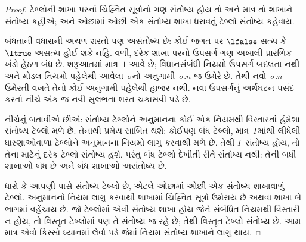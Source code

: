 \begin{proof}
ટેબ્લોની શાખા પરનાં ચિહ્નિત સૂત્રોનો ગણ સંતોષ્ય હોય
તો અને માત્ર તો શાખાને સંતોષ્ય કહીએ; અને ઓછામાં ઓછી એક સંતોષ્ય
શાખા ધરાવતું ટેબ્લો સંતોષ્ય કહેવાય.

બંધતાની વધારાની અચળ-શરતો પણ અસંતોષ્ય છે:
કોઈ જગત પર $\lfalse$ સત્ય કે $\ltrue$ અસત્ય હોઈ શકે નહિ.
વળી, દરેક શાખા પરનો ઉપસર્ગ-ગણ અખાલી પ્રારંભિક ખંડો હેઠળ
બંધ છે. શરૂઆતમાં માત્ર~$1$ આવે છે; વિધાનસંબંધી નિયમો
ઉપસર્ગ બદલતા નથી અને મોડલ નિયમો પહેલેથી આવેલા~$\sigma$નો
અનુગામી~$\sigma.n$ જ ઉમેરે છે. તેથી નવો~$\sigma.n$
ઉમેરતી વખતે તેનો કોઈ અનુગામી પહેલેથી હાજર નથી. નવા
ઉપસર્ગનું અર્થઘટન પસંદ કરતાં નીચે એક જ નવી સુલભતા-શરત
ચકાસવી પડે છે.

નીચેનું બતાવીએ છીએ: સંતોષ્ય ટેબ્લોને અનુમાનના કોઈ એક નિયમથી
વિસ્તારતાં હંમેશા સંતોષ્ય ટેબ્લો મળે છે. તેનાથી પ્રમેય
સાબિત થશે: કોઈપણ બંધ ટેબ્લો, માત્ર~$\Gamma$માંથી લીધેલી
ધારણાઓવાળા ટેબ્લોને અનુમાનના નિયમો લાગુ કરવાથી મળે છે.
તેથી $\Gamma$ સંતોષ્ય હોય, તો તેના માટેનું દરેક ટેબ્લો
સંતોષ્ય હશે. પરંતુ બંધ ટેબ્લો દેખીતી રીતે સંતોષ્ય નથી:
તેની બધી શાખાઓ બંધ છે અને બંધ શાખાઓ અસંતોષ્ય છે.

ધારો કે આપણી પાસે સંતોષ્ય ટેબ્લો છે, એટલે ઓછામાં ઓછી એક
સંતોષ્ય શાખાવાળું ટેબ્લો. અનુમાનનો નિયમ લાગુ કરવાથી
શાખામાં ચિહ્નિત સૂત્રો ઉમેરાય છે અથવા શાખા બે ભાગમાં
વહેંચાય છે. જો ટેબ્લોમાં એવી સંતોષ્ય શાખા હોય જેને સંબંધિત
નિયમથી વિસ્તારી ન હોય, તો વિસ્તૃત ટેબ્લોમાં પણ તે
સંતોષ્ય જ રહે છે; તેથી વિસ્તૃત ટેબ્લો સંતોષ્ય છે. આમ માત્ર એવો
કિસ્સો ધ્યાનમાં લેવો પડે જેમાં નિયમ સંતોષ્ય શાખાને લાગુ થાય.


\end{proof}

